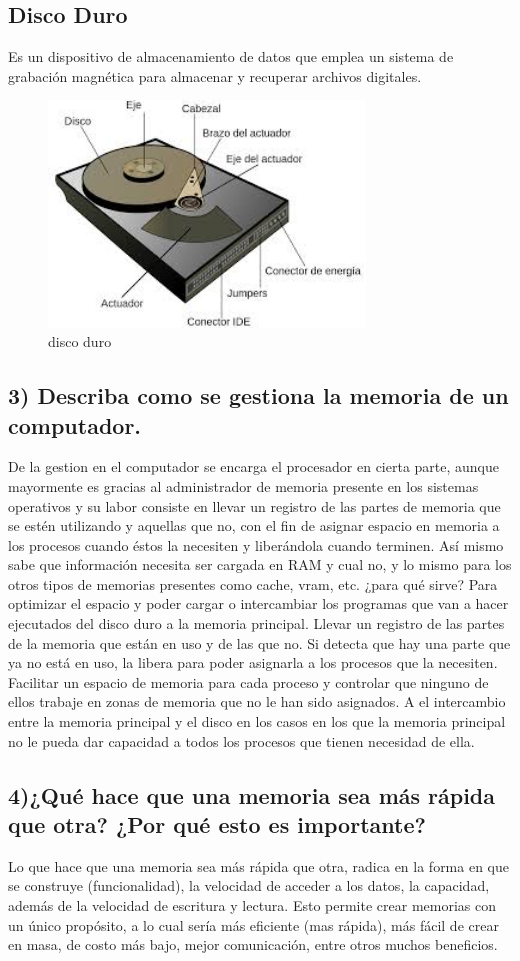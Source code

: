 \documentclass{article}
\begin{document}
\subsection*{Disco Duro}
Es un dispositivo de almacenamiento de datos que emplea un sistema de grabación magnética para almacenar y recuperar archivos digitales.
\begin{figure}[h]
    \centering
    \includegraphics[width=0.75\textwidth]{disco.jpg}
    \caption{disco duro}
    \label{fig:my_label}
\end{figure}
\subsection*{3) Describa como se gestiona la memoria de un computador.}
De la gestion en el computador se encarga el procesador en cierta parte, aunque mayormente es gracias al administrador de memoria presente en los sistemas operativos y su labor consiste en llevar un registro de las partes de memoria que se estén utilizando y aquellas que no, con el fin de asignar espacio en memoria a los procesos cuando éstos la necesiten y liberándola cuando terminen. Así mismo sabe que información necesita ser cargada en RAM y cual no, y lo mismo para los otros tipos de memorias presentes como cache, vram, etc.
¿para qué sirve?
Para optimizar el espacio y poder cargar o intercambiar los programas que van a hacer ejecutados del disco duro a la memoria principal. Llevar un registro de las partes de la memoria que están en uso y de las que no. Si detecta que hay una parte que ya no está en uso, la libera para poder asignarla a los procesos que la necesiten. Facilitar un espacio de memoria para cada proceso y controlar que ninguno de ellos trabaje en zonas de memoria que no le han sido asignados. A el intercambio entre la memoria principal y el disco en los casos en los que la memoria principal no le pueda dar capacidad a todos los procesos que tienen necesidad de ella.\\[0.1cm]
\subsection*{4)¿Qué hace que una memoria sea más rápida que otra? ¿Por qué esto es importante?}
Lo que hace que una memoria sea más rápida que otra, radica en la forma en que se construye (funcionalidad), la velocidad de acceder a los datos, la capacidad, además de la velocidad de escritura y lectura. Esto permite crear memorias con un único propósito, a lo cual sería más eficiente (mas rápida), más fácil de crear en masa, de costo más bajo, mejor comunicación, entre otros muchos beneficios.
\end{document}
